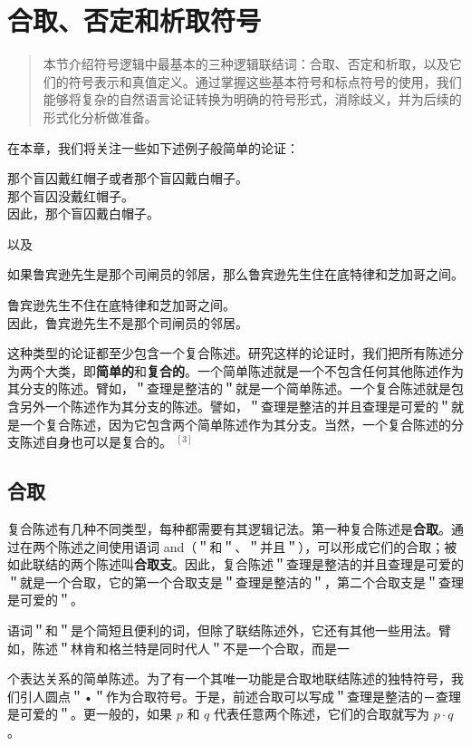 \section{合取、否定和析取符号}

\begin{quotation}
本节介绍符号逻辑中最基本的三种逻辑联结词：合取、否定和析取，以及它们的符号表示和真值定义。通过掌握这些基本符号和标点符号的使用，我们能够将复杂的自然语言论证转换为明确的符号形式，消除歧义，并为后续的形式化分析做准备。
\end{quotation}

在本章，我们将关注一些如下述例子般简单的论证：

那个盲囚戴红帽子或者那个盲囚戴白帽子。\\
那个盲囚没戴红帽子。\\
因此，那个盲囚戴白帽子。

以及

如果鲁宾逊先生是那个司闸员的邻居，那么鲁宾逊先生住在底特律和芝加哥之间。

鲁宾逊先生不住在底特律和芝加哥之间。\\
因此，鲁宾逊先生不是那个司闸员的邻居。

这种类型的论证都至少包含一个复合陈述。研究这样的论证时，我们把所有陈述分为两个大类，即\textbf{简单的}和\textbf{复合的}。一个简单陈述就是一个不包含任何其他陈述作为其分支的陈述。臂如，＂查理是整洁的＂就是一个简单陈述。一个复合陈述就是包含另外一个陈述作为其分支的陈述。譬如，＂查理是整洁的并且查理是可爱的＂就是一个复合陈述，因为它包含两个简单陈述作为其分支。当然，一个复合陈述的分支陈述自身也可以是复合的。 ${ }^{[3]}$

\subsection{合取}
复合陈述有几种不同类型，每种都需要有其逻辑记法。第一种复合陈述是\textbf{合取}。通过在两个陈述之间使用语词 and（＂和＂、＂并且＂），可以形成它们的合取；被如此联结的两个陈述叫\textbf{合取支}。因此，复合陈述＂查理是整洁的并且查理是可爱的＂就是一个合取，它的第一个合取支是＂查理是整洁的＂，第二个合取支是＂查理是可爱的＂。

语词＂和＂是个简短且便利的词，但除了联结陈述外，它还有其他一些用法。臂如，陈述＂林肯和格兰特是同时代人＂不是一个合取，而是一

个表达关系的简单陈述。为了有一个其唯一功能是合取地联结陈述的独特符号，我们引人圆点＂•＂作为合取符号。于是，前述合取可以写成＂查理是整洁的－查理是可爱的＂。更一般的，如果 $p$ 和 $q$ 代表任意两个陈述，它们的合取就写为 $p \cdot q$ 。

